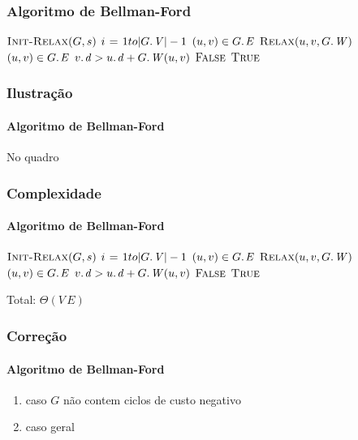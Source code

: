 \documentclass{beamer}
\begin{document}
\begin{frame}
\frametitle{Algoritmo de Bellman-Ford}

\begin{codebox}
\li $\textnormal{\scshape Init-Relax}(G, s)$
\li \For $i \gets 1 to |\attrib{G}{V}| - 1$
\li \Do \For $(u, v) \in \attrib{G}{E}$
\li   \Do $\proc{Relax}(u, v, \attrib{G}{W})$
      \End
    \End
\li \For $(u, v) \in \attrib{G}{E}$
\li \Do \If $\attrib{v}{d} > \attrib{u}{d} + \attrib{G}{W}(u, v)$
\li   \Then \Return $\textnormal{\scshape False}$
      \End
    \End
\li \Return $\textnormal{\scshape True}$
\end{codebox}

\end{frame}

\begin{frame}
\frametitle{Ilustração}
\framesubtitle{Algoritmo de Bellman-Ford}

No quadro

\end{frame}

\begin{frame}
\frametitle{Complexidade}
\framesubtitle{Algoritmo de Bellman-Ford}

\begin{codebox}
\li $\textnormal{\scshape Init-Relax}(G, s)$  
\li \For $i \gets 1 to |\attrib{G}{V}| - 1$  
\li \Do \For $(u, v) \in \attrib{G}{E}$ 
\li   \Do $\proc{Relax}(u, v, \attrib{G}{W})$ 
      \End
    \End
\li \For $(u, v) \in \attrib{G}{E}$ 
\li \Do \If $\attrib{v}{d} > \attrib{u}{d} + \attrib{G}{W}(u, v)$
\li   \Then \Return $\textnormal{\scshape False}$
      \End
    \End
\li \Return $\textnormal{\scshape True}$
\end{codebox}
\pause
\alert{Total: $\Theta(V \, E)$}
\end{frame}

\begin{frame}
\frametitle{Correção}
\framesubtitle{Algoritmo de Bellman-Ford}

\begin{enumerate}
\item caso $G$ não contem ciclos de custo negativo
\item caso geral
\end{enumerate}

\end{frame}
\end{document}
